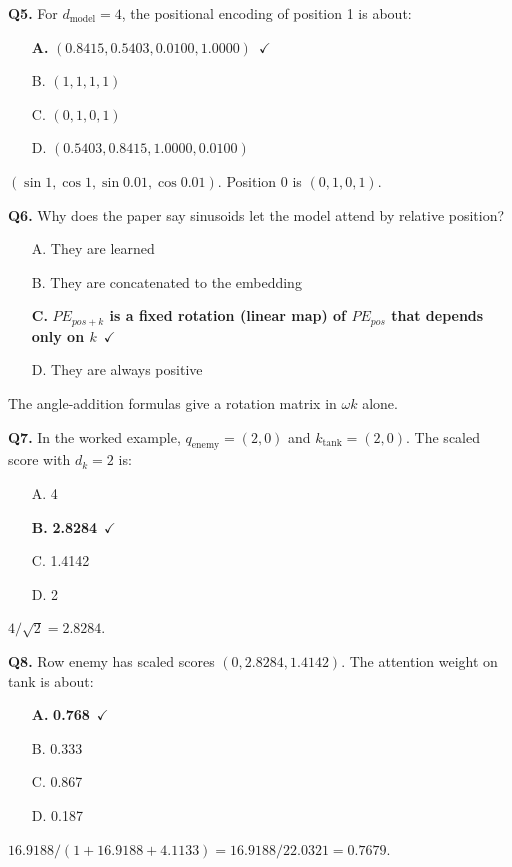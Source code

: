 \documentclass[11pt]{article}
\begin{document}
{\noindent\textbf{Q5.} For $d_{\text{model}}=4$, the positional encoding of position 1 is about:\begin{itemize}[leftmargin=2.2em,itemsep=0pt,topsep=1pt]\item[\textbf{A.}] \textbf{$(0.8415,0.5403,0.0100,1.0000)$}~{\color{GrnN}$\checkmark$}\item[B.] $(1,1,1,1)$\item[C.] $(0,1,0,1)$\item[D.] $(0.5403,0.8415,1.0000,0.0100)$\end{itemize} $(\sin1,\cos1,\sin0.01,\cos0.01)$. Position 0 is $(0,1,0,1)$.\par\medskip

\noindent\textbf{Q6.} Why does the paper say sinusoids let the model attend by relative position?\begin{itemize}[leftmargin=2.2em,itemsep=0pt,topsep=1pt]\item[A.] They are learned\item[B.] They are concatenated to the embedding\item[\textbf{C.}] \textbf{$PE_{pos+k}$ is a fixed rotation (linear map) of $PE_{pos}$ that depends only on $k$}~{\color{GrnN}$\checkmark$}\item[D.] They are always positive\end{itemize} The angle-addition formulas give a rotation matrix in $\omega k$ alone.\par\medskip

\noindent\textbf{Q7.} In the worked example, $q_{\text{enemy}}=(2,0)$ and $k_{\text{tank}}=(2,0)$. The scaled score with $d_k=2$ is:\begin{itemize}[leftmargin=2.2em,itemsep=0pt,topsep=1pt]\item[A.] 4\item[\textbf{B.}] \textbf{2.8284}~{\color{GrnN}$\checkmark$}\item[C.] 1.4142\item[D.] 2\end{itemize} $4/\sqrt2=2.8284$.\par\medskip

\noindent\textbf{Q8.} Row enemy has scaled scores $(0,2.8284,1.4142)$. The attention weight on tank is about:\begin{itemize}[leftmargin=2.2em,itemsep=0pt,topsep=1pt]\item[\textbf{A.}] \textbf{0.768}~{\color{GrnN}$\checkmark$}\item[B.] 0.333\item[C.] 0.867\item[D.] 0.187\end{itemize} $16.9188/(1+16.9188+4.1133)=16.9188/22.0321=0.7679$.\par\medskip

}
\end{document}

